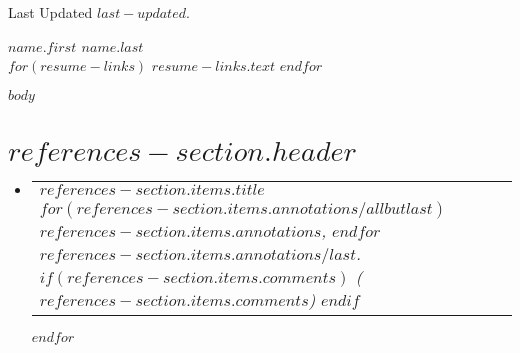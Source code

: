 \documentclass[letterpaper,11pt]{article}
\makeatletter
\newcommand{\sectionItem}[3]{
    \item
    \begin{tabular*}{0.97\textwidth}{l@{\extracolsep{\fill}}r}
      \small\textbf{#1} \\ \textbar \footnotesize\emph{#2} & #3 \\
    \end{tabular*}\vspace{-7pt}
}
\newcommand{\sectionItemsListStart}{\begin{itemize}[leftmargin=0.15in, label={}]}
\newcommand{\sectionItemsListEnd}{\end{itemize}}
\makeatother
\begin{document}
\begin{flushright}
    \color{gray}
    \item
    Last Updated $last-updated$.
  \end{flushright}
  
  \vspace{-5pt}
  
  \begin{center}
      \textbf{\Huge \scshape $name.first$ $name.last$} \\ \vspace{8pt}
      \small 
      $for(resume-links)$
      \href{$resume-links.link$}{\underline{$resume-links.text$}}\hspace{5pt}
      $endfor$
  \end{center}

  \vspace{10pt}
  
  $body$

  \section{$references-section.header$}\label{$references-section.label$}
  \sectionItemsListStart
  $for(references-section.items)$
    \sectionItem
    {$references-section.items.title$}
    {
      $for(references-section.items.annotations/allbutlast)$
      $references-section.items.annotations$, $endfor$
      $references-section.items.annotations/last$.
      $if(references-section.items.comments)$
      ($references-section.items.comments$)
      $endif$
    }
    {}
  $endfor$
  \sectionItemsListEnd
\end{document}
